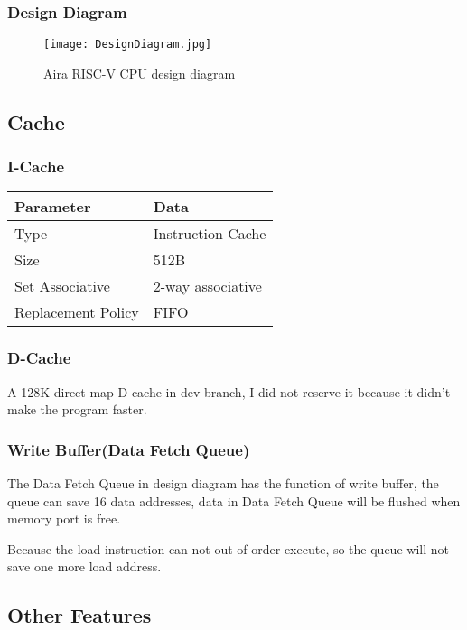 \documentclass[UTF8]{ctexart}
\begin{document}
    \subsubsection{Design Diagram}

    \begin{figure}[h]
    \texttt{[image: DesignDiagram.jpg]}
    \caption{Aira RISC-V CPU design diagram}
    \end{figure}

    \subsection{Cache}
    \subsubsection{I-Cache}
    \begin{center}
        \begin{tabular}{ll}
            \hline
            Parameter & Data\\
            \hline
            Type & Instruction Cache \\
            \hline
            Size & 512B              \\
            \hline
            Set Associative & 2-way associative \\
            \hline
            Replacement Policy & FIFO \\
            \hline
        \end{tabular}
    \end{center}
    \subsubsection{D-Cache}
        A 128K direct-map D-cache in dev branch, I did not reserve it because it didn't make the program faster.
    \subsubsection{Write Buffer(Data Fetch Queue)}
    The Data Fetch Queue in design diagram has the function of write buffer, the queue can save 16 data addresses,
    data in Data Fetch Queue will be flushed when memory port is free. 

        Because the load instruction can not out of order execute, so the queue will not
        save one more load address.
    \subsection{Other Features}
\end{document}
